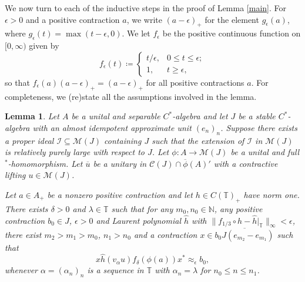 \documentclass[reqno]{amsart}
\newtheorem{lem}[thm]{Lemma}
\theoremstyle{definition}
\theoremstyle{remark}
\numberwithin{equation}{section}
\theoremstyle{definition}
\newcommand{\calC}{\mathcal{C}}
\newcommand{\calM}{\mathcal{M}}
\newcommand{\calI}{\mathcal{I}}
\begin{document}
We now turn to each of the inductive steps in the proof of Lemma \ref{main}. For $\epsilon>0$ and a positive contraction $a$, we write $(a-\epsilon)_+$ for the element $g_\epsilon(a)$, where $g_\epsilon(t)=\max(t-\epsilon,0)$. We let $f_\epsilon$ be the positive continuous function on $[0, \infty)$ given by
\begin{equation} 
\label{stair_function} 
f_{\epsilon}(t) \coloneqq
\begin{cases} 
t/\epsilon, & 0\leq t\leq \epsilon; \\
1, & t\geq \epsilon,
\end{cases} 
\end{equation}
so that $f_\epsilon(a)(a-\epsilon)_+=(a-\epsilon)_+$ for all positive contractions $a$. For completeness, we (re)state all the assumptions involved in the lemma. 

\begin{lem} \label{finite_block_approx}  
Let $A$ be a unital and separable $C^*$-algebra and let $J$ be a stable $C^*$-algebra with an almost idempotent approximate unit $(e_{n})_{n}$. Suppose there exists a proper ideal $\calI\subseteq\calM(J)$ containing $J$ such that the extension of $\calI$ in $\calM(J)$ is relatively purely large with respect to $J$. Let $\phi: A \rightarrow\calM(J)$ be a unital and full $^*$-homomorphism. Let $\overline{u}$ be a unitary in $\calC(J)\cap \overline{\phi}(A)'$ with a contractive lifting $u\in \calM(J)$. 

Let $a\in A_{+}$ be a nonzero positive contraction and let $h\in C(\mathbb T)_+$ have norm one. There exists $\delta>0$ and $\lambda\in\mathbb T$ such that for any $m_{0}, n_{0}\in \mathbb{N}$, any positive contraction $b_{0}\in J$, $\epsilon>0$ and Laurent polynomial $\hat{h}$ with $\|f_{1/3}\circ h-\hat{h}|_{\mathbb{T}}\|_{\infty} < {\epsilon}$, there exist $m_{2}>m_{1}>m_{0}$, $n_{1}>n_{0}$ and a contraction $x\in \overline{b_{0}J(e_{m_{2}}-e_{m_{1}})}$ such that 
\begin{equation} 
x\hat{h}(v_{\alpha}u) f_{\delta}(\phi(a)) x^{\ast}\approx_{ \epsilon}  b_{0},  
\end{equation} 
whenever $\alpha = (\alpha_{n})_{n}$ is a sequence in $\mathbb{T}$ with $\alpha_{n} = \lambda$ for $n_{0}\leq n \leq n_{1}$. 
\end{lem}   
\end{document}
